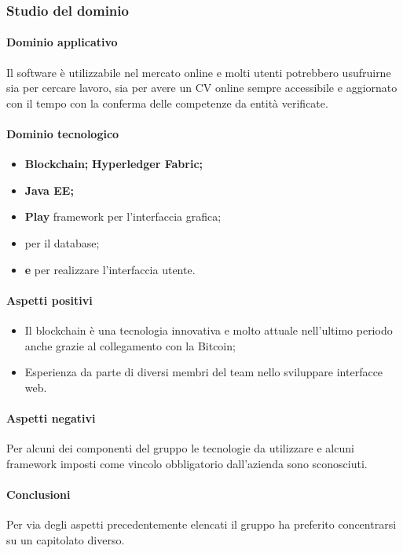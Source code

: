 	\subsubsection{Studio del dominio}
	\paragraph{Dominio applicativo} \Spazio
	Il software è utilizzabile nel mercato online e molti utenti potrebbero usufruirne sia per cercare lavoro, sia per avere un CV online sempre accessibile e aggiornato con il tempo con la conferma delle competenze da entità verificate.
	\paragraph{Dominio tecnologico} \Spazio
	\begin{itemize}
		\item \textbf{Blockchain;}
		\textbf{Hyperledger Fabric;}
		\item  \textbf{Java EE;}
		\item  \textbf{Play} framework per l'interfaccia grafica;
		\item  \textbf{} per il database;
		\item  \textbf{ e } per realizzare l'interfaccia utente.
	\end{itemize}
	
	\paragraph{Aspetti positivi} \Spazio
	\begin{itemize}
		\item {Il blockchain è una tecnologia innovativa e molto attuale nell'ultimo periodo anche grazie al collegamento con la  Bitcoin;}
		\item {Esperienza da parte di diversi membri del team nello sviluppare interfacce web.}
	\end{itemize} 
	\paragraph{Aspetti negativi} \Spazio
	Per alcuni dei componenti del gruppo le tecnologie da utilizzare e alcuni framework imposti come vincolo obbligatorio dall'azienda sono sconosciuti.
	\paragraph{Conclusioni} \Spazio
	Per via degli aspetti precedentemente elencati il gruppo ha preferito concentrarsi su un capitolato diverso.
	
